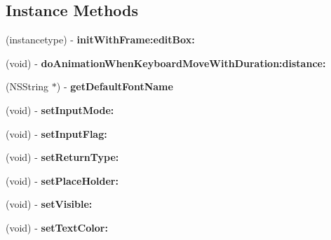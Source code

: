\subsection*{Instance Methods}
\begin{DoxyCompactItemize}
\item 
\mbox{\label{interfaceUIEditBoxImplIOS__objc_aae03a92d130e92f575b0c9dc5fe69a7a}} 
(instancetype) -\/ {\bfseries init\+With\+Frame\+:edit\+Box\+:}
\item 
\mbox{\label{interfaceUIEditBoxImplIOS__objc_a7a8feac60910e1d262d530f0b130c7b0}} 
(void) -\/ {\bfseries do\+Animation\+When\+Keyboard\+Move\+With\+Duration\+:distance\+:}
\item 
\mbox{\label{interfaceUIEditBoxImplIOS__objc_ae4b2680bba0c6e5b3c576fda1afd7a42}} 
(N\+S\+String $\ast$) -\/ {\bfseries get\+Default\+Font\+Name}
\item 
\mbox{\label{interfaceUIEditBoxImplIOS__objc_a1d9fee7a9c20659040d5e3a09b3c1496}} 
(void) -\/ {\bfseries set\+Input\+Mode\+:}
\item 
\mbox{\label{interfaceUIEditBoxImplIOS__objc_a0e2f54e033029c396302d692f0b96874}} 
(void) -\/ {\bfseries set\+Input\+Flag\+:}
\item 
\mbox{\label{interfaceUIEditBoxImplIOS__objc_a87f8b88fcfb5b6fc6a0b6168aeb54bd7}} 
(void) -\/ {\bfseries set\+Return\+Type\+:}
\item 
\mbox{\label{interfaceUIEditBoxImplIOS__objc_a6069c372e39ee720ebcbefdd03692e69}} 
(void) -\/ {\bfseries set\+Place\+Holder\+:}
\item 
\mbox{\label{interfaceUIEditBoxImplIOS__objc_a45a1f41bc4acf6dde928862f27c93188}} 
(void) -\/ {\bfseries set\+Visible\+:}
\item 
\mbox{\label{interfaceUIEditBoxImplIOS__objc_a0ecf762f9006dc2697abb348a3e2ad3e}} 
(void) -\/ {\bfseries set\+Text\+Color\+:}

\end{DoxyCompactItemize}
